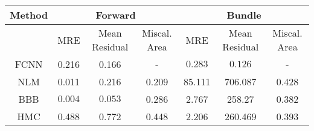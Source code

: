 \documentclass[convert={outext=.png}]{standalone}
\begin{document}
\centering
\label{tab:experimental_results}



\begin{tabular}{c c c c c c c}
\hline
\hline
Method &  \multicolumn{3}{c}{Forward} & \multicolumn{3}{c}{Bundle} \\ \hline
 & MRE & Mean Residual & Miscal. Area & MRE & Mean Residual & Miscal. Area\\
 FCNN & 0.216 & 0.166 & - & $\mathbf{0.283}$ & $\mathbf{0.126}$ & - \\
 \hline
 NLM & 0.011 & 0.216 & 0.209 & 85.111 & 706.087 & 0.428 \\
 BBB & $\mathbf{0.004}$ & $\mathbf{0.053}$ & 0.286 & 2.767 & 258.27 & 0.382 \\
 HMC & 0.488 & 0.772 & 0.448 & 2.206 & 260.469 & 0.393 \\
\hline
\hline
\end{tabular}
\end{document}
